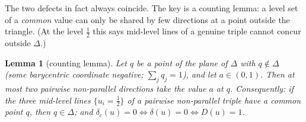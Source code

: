 \documentclass{aims}
\numberwithin{equation}{section}
\theoremstyle{plain}
\newtheorem{lemma}[theorem]{Lemma}
\theoremstyle{definition}
\theoremstyle{remark}
\begin{document}
The two defects in fact always coincide. The key is a counting lemma: a
level set of a \emph{common} value can only be shared by few directions at a
point outside the triangle. (At the level $\tfrac12$ this says mid-level
lines of a genuine triple cannot concur outside $\Delta$.)

\begin{lemma}[counting lemma]\label{lem:external}
Let $q$ be a point of the plane of $\Delta$ with $q\notin\Delta$ (some
barycentric coordinate negative; $\sum_jq_j=1$), and let $a\in(0,1)$. Then at
most \emph{two} pairwise non-parallel directions take the value $a$ at $q$.
Consequently: if the three mid-level lines $\{u_i=\tfrac12\}$ of a pairwise
non-parallel triple have a common point $q$, then $q\in\Delta$; and
$\delta_c(u)=0\iff\delta(u)=0\iff D(u)=1$.
\end{lemma}
\end{document}
